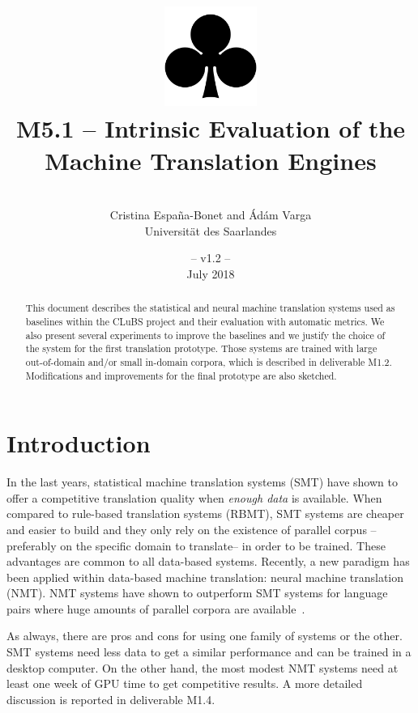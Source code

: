 \documentclass[a4paper,11pt]{article}
\title{
\includegraphics[width=3cm]{./img/200px-SuitClubs.png} \\
\Huge M5.1 -- Intrinsic Evaluation of the \\ Machine Translation Engines \\ 
}
\author{\vspace*{1cm}\\ \LARGE Cristina Espa\~na-Bonet and \'Ad\'am Varga \medskip \\ \Large Universit\"at des Saarlandes}
\date{\vspace*{2cm} -- v1.2 --\\July 2018}
\begin{document}
\clearpage\maketitle
\thispagestyle{empty}

\vspace*{4cm}
\begin{abstract}
This document describes the statistical and neural machine translation systems used as baselines within the CLuBS project and their evaluation with automatic metrics. We also present several experiments to improve the baselines and we justify the choice of the system for the first translation prototype. Those systems are trained with large out-of-domain and/or small in-domain corpora, which is described in deliverable M1.2. Modifications and improvements for the final prototype are also sketched.
\end{abstract}

\newpage
\tableofcontents
\clearpage


\section{Introduction}
\label{s:intro}

In the last years, statistical machine translation systems (SMT) have shown to offer a competitive translation quality when \emph{enough data} is available. When compared to rule-based translation systems (RBMT), SMT systems are cheaper and easier to build and they only rely on the existence of parallel corpus --preferably on the specific domain to translate-- in order to be trained. These advantages are common to all data-based systems. Recently, a new paradigm has been applied within data-based machine translation: neural machine translation (NMT). NMT systems have shown to outperform SMT systems for language pairs where huge amounts of parallel corpora are available~\cite{WMT1:2016,WMT2:2017}.

As always, there are pros and cons for using one family of systems or the other. SMT systems need less data to get a similar performance and can be trained in a desktop computer. On the other hand, the most modest NMT systems need at least one week of GPU time to get competitive results. A more detailed discussion is reported in deliverable M1.4.
\end{document}
